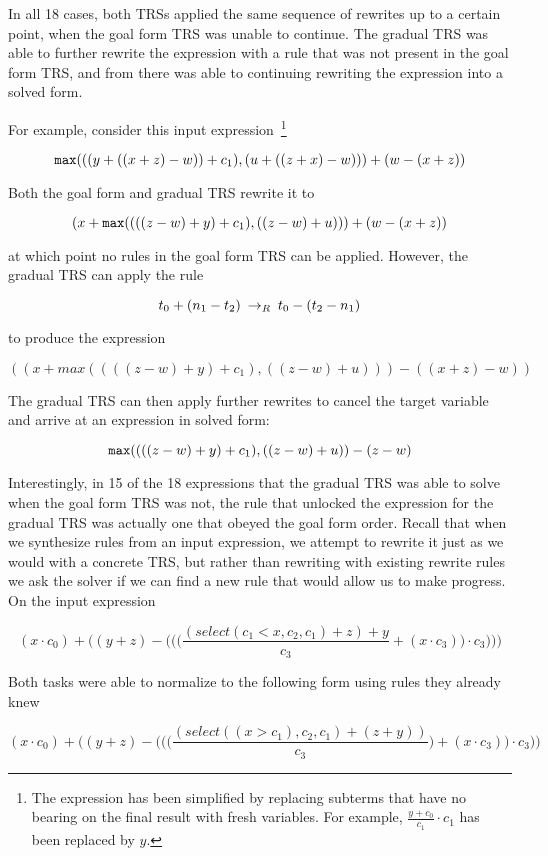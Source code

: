 In all 18 cases, both TRSs applied the same sequence of rewrites up to a certain point, when the goal form TRS was unable to continue. The gradual TRS was able to further rewrite the expression with a rule that was not present in the goal form TRS, and from there was able to continuing rewriting the expression into a solved form.

For example, consider this input expression~\footnote{The expression has been simplified by replacing subterms that have no bearing on the final result with fresh variables. For example, $\frac{y + c_0}{c_1} \cdot c_1$ has been replaced by $y$.}

\[ \texttt{max}{(((y + ((x + z) - w)) + c_1), (u + ((z + x) - w)))} + (w - (x + z))
\]

Both the goal form and gradual TRS rewrite it to

\[ (x + \texttt{max}{((((z - w) + y) + c_1), ((z - w) + u))}) + (w - (x + z))
\]

at which point no rules in the goal form TRS can be applied. However, the gradual TRS can apply the rule

\[ t_0 + (n_1 - t_2) \:\rightarrow_{R}\: t_0 - (t_2 - n_1)
\]

to produce the expression

\[ ((x + max((((z - w) + y) + c_1), ((z - w) + u))) - ((x + z) - w))
\]

The gradual TRS can then apply further rewrites to cancel the target variable and arrive at an expression in solved form:

\[ \texttt{max}{((((z - w) + y) + c_1), ((z - w) + u))} - (z - w)
\]

Interestingly, in 15 of the 18 expressions that the gradual TRS was able to solve when the goal form TRS was not, the rule that unlocked the expression for the gradual TRS was actually one that obeyed the goal form order. Recall that when we synthesize rules from an input expression, we attempt to rewrite it just as we would with a concrete TRS, but rather than rewriting with existing rewrite rules we ask the solver if we can find a new rule that would allow us to make progress. On the input expression

\[ (x \cdot c_0) + \Big((y + z) - \Big(\Big(\Big(\frac{(select(c_1 < x, c_2, c_1) + z) + y}{c_3} + (x \cdot c_3)\Big) \cdot c_3\Big)\Big)\Big)
\]

Both tasks were able to normalize to the following form using rules they already knew

\[ (x \cdot c_0) + \Big((y + z) - \Big(\Big(\Big(\frac{(select((x > c_1), c_2, c_1) + (z + y))}{c_3}\Big) + (x \cdot c_3)\Big) \cdot c_3\Big)\Big)
\]

